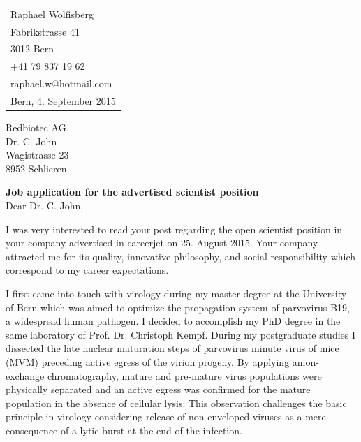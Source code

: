 \documentclass[11pt, a4paper]{article}
\begin{document}
\setlength{\parindent}{0 cm}
\setlength{\voffset}{-3.2cm}

\hfill\begin{tabular}{l}
Raphael Wolfisberg \\
Fabrikstrasse 41 \\
3012 Bern \\ [0.2 cm]

+41 79 837 19 62 \\
raphael.w@hotmail.com \\ [0.5 cm]
Bern, 4. September 2015
\end{tabular}


\begin{flushleft}
Redbiotec AG \\
Dr. C. John \\
Wagistrasse 23 \\
8952 Schlieren \\ [0.3 cm]

\end{flushleft}

\vspace{1 cm}










\textbf{\large{Job application for the advertised scientist position}} \\[0.2 cm]


Dear Dr. C. John,

\bigskip
I was very interested to read your post regarding the open scientist position in your company advertised in careerjet on 25. August 2015. Your company attracted me for its quality, innovative philosophy, and social responsibility which correspond to my career expectations. 

\medskip
I first came into touch with virology during my master degree at the University of Bern which was aimed to optimize the propagation system of parvovirus B19, a widespread human pathogen. I decided to accomplish my PhD degree in the same laboratory of Prof. Dr. Christoph Kempf. During my postgraduate studies I dissected the late nuclear maturation steps of parvovirus minute virus of mice (MVM) preceding active egress of the virion progeny. By applying anion-exchange chromatography, mature and pre-mature virus populations were physically separated and an active egress was confirmed for the mature population in the absence of cellular lysis. This observation challenges the basic principle in virology considering release of non-enveloped viruses as a mere consequence of a lytic burst at the end of the infection.  
\end{document}
